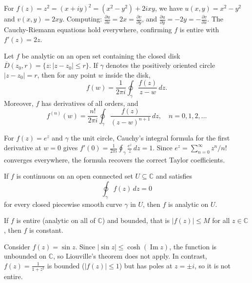 \begin{example}
For $f(z) = z^2 = (x+iy)^2 = (x^2 - y^2) + 2ixy$, we have $u(x,y) = x^2 - y^2$ and $v(x,y) = 2xy$. Computing: $\frac{\partial u}{\partial x} = 2x = \frac{\partial v}{\partial y}$, and $\frac{\partial u}{\partial y} = -2y = -\frac{\partial v}{\partial x}$. The Cauchy-Riemann equations hold everywhere, confirming $f$ is entire with $f'(z) = 2z$.
\end{example}

\begin{theorem}
Let $f$ be analytic on an open set containing the closed disk $\overline{D}(z_0, r) = \{z : |z - z_0| \leq r\}$. If $\gamma$ denotes the positively oriented circle $|z - z_0| = r$, then for any point $w$ inside the disk,
\[
f(w) = \frac{1}{2\pi i} \oint_\gamma \frac{f(z)}{z - w} \, dz.
\]
Moreover, $f$ has derivatives of all orders, and
\[
f^{(n)}(w) = \frac{n!}{2\pi i} \oint_\gamma \frac{f(z)}{(z - w)^{n+1}} \, dz, \quad n = 0, 1, 2, \ldots
\]
\end{theorem}

\begin{example}
For $f(z) = e^z$ and $\gamma$ the unit circle, Cauchy's integral formula for the first derivative at $w = 0$ gives $f'(0) = \frac{1}{2\pi i} \oint_\gamma \frac{e^z}{z} \, dz = 1$. Since $e^z = \sum_{n=0}^\infty z^n/n!$ converges everywhere, the formula recovers the correct Taylor coefficients.
\end{example}

\begin{theorem}
If $f$ is continuous on an open connected set $U \subseteq \mathbb{C}$ and satisfies
\[
\oint_\gamma f(z) \, dz = 0
\]
for every closed piecewise smooth curve $\gamma$ in $U$, then $f$ is analytic on $U$.
\end{theorem}

\begin{theorem}
If $f$ is entire (analytic on all of $\mathbb{C}$) and bounded, that is $|f(z)| \leq M$ for all $z \in \mathbb{C}$, then $f$ is constant.
\end{theorem}

\begin{example}
Consider $f(z) = \sin z$. Since $|\sin z| \leq \cosh(\operatorname{Im}z)$, the function is unbounded on $\mathbb{C}$, so Liouville's theorem does not apply. In contrast, $f(z) = \frac{1}{1+z^2}$ is bounded ($|f(z)| \leq 1$) but has poles at $z = \pm i$, so it is not entire.
\end{example}

